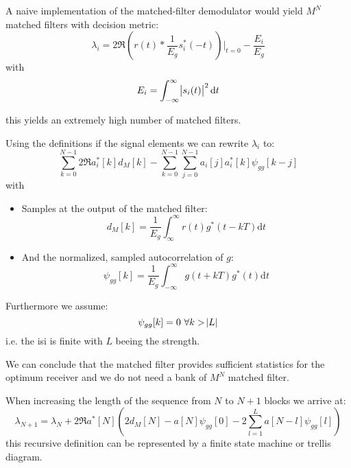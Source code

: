 A naive implementation of the matched-filter demodulator would yield $M^N$ matched
filters with decision metric:
\begin{equation}
    \lambda_i = 2 \Re{\left(r(t) * \frac{1}{E_g} s_i^*(-t)\right)\vert_{t=0}} - \frac{E_i}{E_g}
\end{equation}
with
\begin{equation}
    E_i = \int_{-\infty}^\infty \abs{s_i(t)}^2 \text{d}t
\end{equation}

this yields an extremely high number of matched filters.

Using the definitions if the signal elements we can rewrite $\lambda_i$ to:
\begin{equation}
    \sum_{k=0}^{N-1} 2 \Re{a_i^*[k] d_M[k]} - \sum_{k=0}^{N-1} \sum_{j=0}^{N-1}
        a_i[j] a_i^*[k] \psi_{gg}[k-j]
\end{equation}
with
\begin{itemize}
    \item Samples at the output of the matched filter:
        \begin{equation}
            d_M[k] = \frac{1}{E_g} \int_{\infty}^\infty r(t) g^*(t-kT)\text{d}t
        \end{equation}
    \item And the normalized, sampled autocorrelation of $g$:
        \begin{equation}
            \psi_{gg}[k] = \frac{1}{E_g} \int_{-\infty}^\infty g(t+kT) g^*(t) \text{d}t
        \end{equation}
\end{itemize}
Furthermore we assume:
\begin{equation}
    \psi_{gg}[k] = 0\ \forall k > \abs{L}
\end{equation}
i.e. the \ac{isi} is finite with $L$ beeing the strength.

We can conclude that the matched filter provides sufficient statistics for the optimum
receiver and we do not need a bank of $M^N$ matched filter.

When increasing the length of the sequence from $N$ to $N+1$ blocks we arrive at:
\begin{equation}
    \lambda_{N+1} = \lambda_N + 2 \Re{a^*[N] \left(
        2 d_M[N] - a[N] \psi_{gg}[0] - 2 \sum_{l=1}^L a[N-l] \psi_{gg}[l]\right)}
\end{equation}
this recursive definition can be represented by a finite state machine or trellis
diagram.

